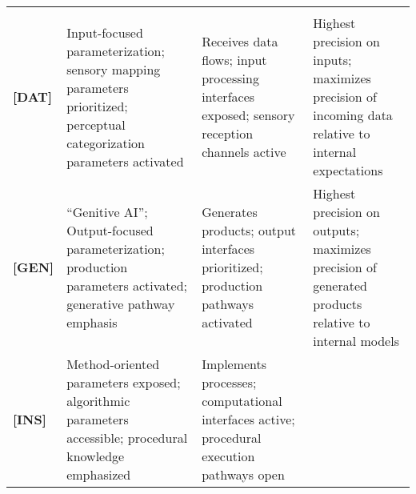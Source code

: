 \begin{longtable}[]{@{}llll@{}}
\begin{minipage}[t]{0.24\columnwidth}
\end{minipage}\tabularnewline
\begin{minipage}[t]{0.08\columnwidth}\raggedright
\textbf{{[}DAT{]}}\strut
\end{minipage} & \begin{minipage}[t]{0.24\columnwidth}\raggedright
Input-focused parameterization; sensory mapping parameters prioritized;
perceptual categorization parameters activated\strut
\end{minipage} & \begin{minipage}[t]{0.33\columnwidth}\raggedright
Receives data flows; input processing interfaces exposed; sensory
reception channels active\strut
\end{minipage} & \begin{minipage}[t]{0.24\columnwidth}\raggedright
Highest precision on inputs; maximizes precision of incoming data
relative to internal expectations\strut
\end{minipage}\tabularnewline
\begin{minipage}[t]{0.08\columnwidth}\raggedright
\textbf{{[}GEN{]}}\strut
\end{minipage} & \begin{minipage}[t]{0.24\columnwidth}\raggedright
``Genitive AI''; Output-focused parameterization; production parameters
activated; generative pathway emphasis\strut
\end{minipage} & \begin{minipage}[t]{0.33\columnwidth}\raggedright
Generates products; output interfaces prioritized; production pathways
activated\strut
\end{minipage} & \begin{minipage}[t]{0.24\columnwidth}\raggedright
Highest precision on outputs; maximizes precision of generated products
relative to internal models\strut
\end{minipage}\tabularnewline
\begin{minipage}[t]{0.08\columnwidth}\raggedright
\textbf{{[}INS{]}}\strut
\end{minipage} & \begin{minipage}[t]{0.24\columnwidth}\raggedright
Method-oriented parameters exposed; algorithmic parameters accessible;
procedural knowledge emphasized\strut
\end{minipage} & \begin{minipage}[t]{0.33\columnwidth}\raggedright
Implements processes; computational interfaces active; procedural
execution pathways open\strut
\end{minipage} & \begin{minipage}[t]{0.24\columnwidth}\raggedright

\end{minipage}
\end{longtable}
